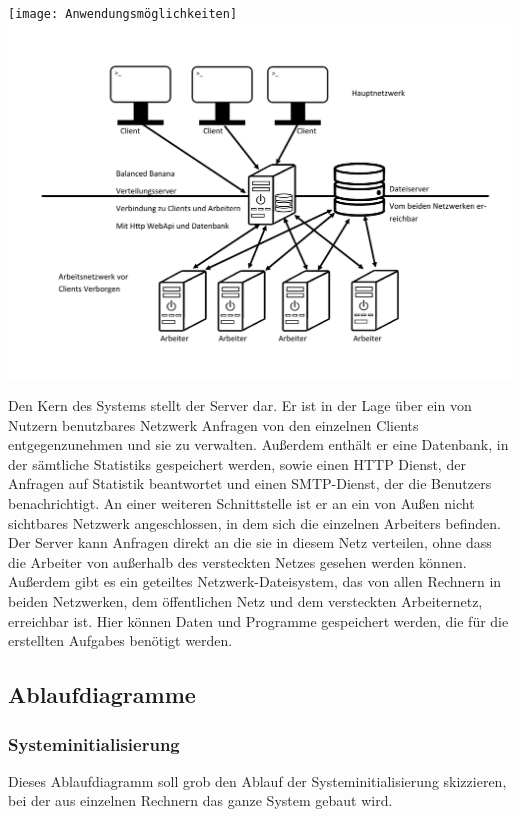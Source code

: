\documentclass[a4paper,12pt]{article}
\begin{document}
\texttt{[image: Anwendungsmöglichkeiten]}
\includegraphics[width=\textwidth]{Systemmodelle/Systemaufbau}

Den Kern des Systems stellt der \gls{Server} dar. Er ist in der Lage über ein von Nutzern benutzbares Netzwerk Anfragen von den einzelnen \glspl{Client} entgegenzunehmen und sie zu verwalten.
Außerdem enthält er eine \gls{Datenbank}, in der sämtliche \glspl{Statistik} gespeichert werden, sowie einen HTTP Dienst, der Anfragen auf \gls{Statistik} beantwortet und einen SMTP-Dienst, der die \glspl{Benutzer} benachrichtigt. An einer weiteren Schnittstelle ist er an ein von Außen nicht sichtbares Netzwerk angeschlossen, in dem sich die einzelnen \glspl{Arbeiter} befinden. Der \gls{Server} kann Anfragen direkt an die sie in diesem Netz verteilen, ohne dass die \gls{Arbeiter} von außerhalb des versteckten Netzes gesehen werden können. Außerdem gibt es ein geteiltes Netzwerk-Dateisystem, das von allen Rechnern in beiden Netzwerken, dem öffentlichen Netz und dem versteckten Arbeiternetz, erreichbar ist. Hier können Daten und Programme gespeichert werden, die für die erstellten \glspl{Aufgabe} benötigt werden.

\subsection{Ablaufdiagramme}
\subsubsection{Systeminitialisierung}
Dieses Ablaufdiagramm soll grob den Ablauf der Systeminitialisierung skizzieren, bei der aus einzelnen Rechnern das ganze System gebaut wird.\\
\end{document}
